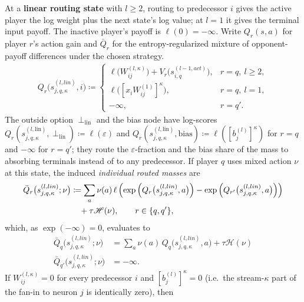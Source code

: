 \begin{definition}
At a \textbf{linear routing state} with $l\geq2$, routing to predecessor $i$ gives the active
player the log weight plus the next state's log value; at $l=1$ it gives the terminal input payoff.
The inactive player's payoff is $\ell(0)=-\infty$. Write $Q_r(s,a)$ for player $r$'s action gain and
$\bar Q_r$ for the entropy-regularized mixture of opponent-payoff differences under the chosen strategy.
\begin{align}\label{ptnb:eq:routing-linear-action}
    Q_r \bigl( s_{j,q,\kappa}^{(l, lin)}, i \bigr)
    \coloneqq
    \begin{cases}
        \ell\!\bigl(W_{ij}^{(l,\kappa)}\bigr) + V_r\bigl(s_{i,q}^{(l-1, act)}\bigr), & r=q,\ l \ge 2,\\[0.35em]
        \ell\!\bigl([x_iW_{ij}^{(1)}]^\kappa\bigr), & r=q,\ l = 1,\\[0.35em]
        -\infty, & r=q'.
    \end{cases}
\end{align}
The outside option $\perp_{\mathrm{lin}}$ and the bias node have log-scores
$Q_r(s_{j,q,\kappa}^{(l,\mathrm{lin})}, \perp_{\mathrm{lin}}) \coloneqq \ell(\varepsilon)$ and
$Q_r(s_{j,q,\kappa}^{(l,\mathrm{lin})}, \mathrm{bias}) \coloneqq \ell([b_j^{(l)}]^\kappa)$ for $r =
    q$ and $-\infty$ for $r = q'$; they route the $\varepsilon$-fraction and the bias share of the mass
to absorbing terminals instead of to any predecessor.
If player $q$ uses mixed action $\nu$ at this state, the induced \emph{individual routed masses}
are
\begin{align}\label{ptnb:eq:optimal-linear}
    \bar Q_r \bigl( s_{j,q,\kappa}^{(l, lin)};\nu \bigr)
    &\coloneqq
    \sum_a \nu(a)\, \ell \left( \exp \left( Q_r \bigl( s_{j,q,\kappa}^{(l, lin)}, a \bigr) \right) -
    \exp \left( Q_{r'} \bigl( s_{j,q,\kappa}^{(l, lin)}, a \bigr) \right) \right) \notag\\
    &\quad + \tau \mathcal{H}(\nu),
    \qquad r \in \{q,q'\},
\end{align}
which, as $\exp(-\infty)=0$, evaluates to
\begin{align}
    \bar Q_q \bigl( s_{j,q,\kappa}^{(l, lin)};\nu \bigr)
    &=
    \sum_a \nu(a)\, Q_q \bigl( s_{j,q,\kappa}^{(l, lin)}, a \bigr)
    + \tau \mathcal{H}(\nu) \\
    \bar Q_{q'} \bigl( s_{j,q,\kappa}^{(l, lin)};\nu \bigr)
    &= -\infty.
\end{align}
If $W_{ij}^{(l,\kappa)} = 0$ for every predecessor $i$ and $[b_j^{(l)}]^\kappa = 0$ (i.e.\ the
stream-$\kappa$ part of the fan-in to neuron $j$ is identically zero), then

\end{definition}
